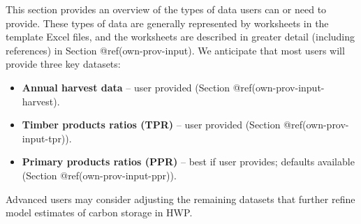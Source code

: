 \documentclass[
  openany]{book}
\providecommand{\tightlist}{%
  \setlength{\itemsep}{0pt}\setlength{\parskip}{0pt}}
\begin{document}
This section provides an overview of the types of data users can or need
to provide. These types of data are generally represented by worksheets
in the template Excel files, and the worksheets are described in greater
detail (including references) in Section @ref(own-prov-input). We
anticipate that most users will provide three key datasets:

\begin{itemize}
\tightlist
\item
  \textbf{Annual harvest data} -- user provided (Section
  @ref(own-prov-input-harvest).\\
\item
  \textbf{Timber products ratios (TPR)} -- user provided (Section
  @ref(own-prov-input-tpr)).\\
\item
  \textbf{Primary products ratios (PPR)} -- best if user provides;
  defaults available (Section @ref(own-prov-input-ppr)).
\end{itemize}

Advanced users may consider adjusting the remaining datasets that
further refine model estimates of carbon storage in HWP.
\end{document}
